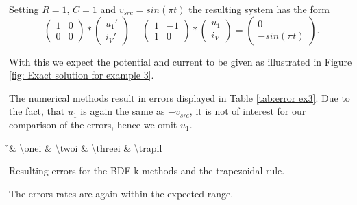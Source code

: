 \begin{example3}
	Setting $R=1$, $C=1$ and $v_{src} = sin(\pi t)$ the resulting system has the form
	\begin{displaymath}
			\begin{pmatrix}
			1 & 0 \\
			0 & 0 
		\end{pmatrix}
		*
		\begin{pmatrix}
			u_1' \\
			i_V'
		\end{pmatrix}
		+
		\begin{pmatrix}
			1 & -1 \\
			1 & 0
		\end{pmatrix}
		*
		\begin{pmatrix}
			u_1 \\
			i_V
		\end{pmatrix}
		=
		\begin{pmatrix}
			0 \\
			-sin(\pi t)
		\end{pmatrix}.
	\end{displaymath}
		
	With this we expect the potential and current to be given as illustrated in Figure \ref{fig: Exact solution for example 3}.

	The numerical methods result in errors displayed in Table \ref{tab:error ex3}. Due to the fact, that $u_1$ is again the same as $-v_{src}$, it is not of interest for our comparison of the errors, hence we omit $u_1$.
	
	\begin{table}[H]
			\centering
			{\h & \num{\onei} & \num{\twoi} & \num{\threei} & \num{\trapil}}
		\caption{Resulting errors for the BDF-k methods and the trapezoidal rule.}
		\label{tab:error ex3}
	\end{table}
	
	The errors rates are again within the expected range.
		
\end{example3}
	
